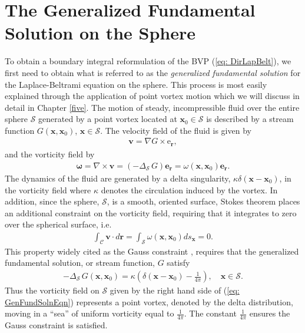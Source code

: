 \documentclass{sfuthesis}
\begin{document}
\section{The Generalized Fundamental Solution on the Sphere}
\label{sec: GenFundSoln}
To obtain a boundary integral reformulation of the BVP (\ref{eq: DirLapBelt}), we first need to obtain what is referred to as the \textit{generalized fundamental solution} for the Laplace-Beltrami equation on the sphere. This process is most easily explained through the application of point vortex motion which we will discuss in detail in Chapter \ref{five}. The motion of steady, incompressible fluid over the entire sphere $\mathcal{S}$ generated by a point vortex located at $\mathbf{x}_0 \in \mathcal{S}$ is described by a stream function $G(\mathbf{x},\mathbf{x}_0)$, $\mathbf{x} \in \mathcal{S}$. The velocity field of the fluid is given by 
\begin{align*}
	\mathbf{v}=\nabla G \times \text{e}_\mathbf{r},
\end{align*} 
and the vorticity field by 
\begin{align*}
	\bm{\omega}=\nabla \times \mathbf{v}=\left(-\Delta_{\mathcal{S}\ } G \right)\mathbf{e}_\mathbf{r}=\omega(\mathbf{x}, \mathbf{x}_0) \mathbf{e}_\mathbf{r}.
\end{align*}
The dynamics of the fluid are generated by a delta singularity, $\kappa \delta(\mathbf{x}-\mathbf{x}_0)$, in the vorticity field where $\kappa$ denotes the circulation induced by the vortex. 
In addition, since the sphere, $\mathcal{S}$, is a smooth, oriented surface, Stokes theorem places an additional constraint on the vorticity field, requiring that it integrates to zero over the spherical surface, i.e. 
\begin{align}
	\int_\mathcal{C} \mathbf{v} \cdot d\mathbf{r}=\int_\mathcal{S} \omega(\mathbf{x}, \mathbf{x}_0) ds_\mathbf{x} =0.  \label{eq: GaussConstraint} 
\end{align}
This property widely cited as the Gauss constraint \cite{Crowdy2006, Newt2001, Drit15, Crowdy2003, GemmNigStein2008}, requires that the generalized fundamental solution, or stream function, $G$ satisfy
\begin{align}
	-{\Delta}_{\mathcal{S} \ } G(\mathbf{x}, {\mathbf{x}}_0) = \kappa \left(\delta(\mathbf{x}-{\mathbf{x}}_0) - \frac{1}{4\pi}\right), \quad \mathbf{x} \in \mathcal{S}. \label{eq: GenFundSolnEqn} 
\end{align}
Thus the vorticity field on $\mathcal{S}$ given by the right hand side of (\ref{eq: GenFundSolnEqn}) represents a point vortex, denoted by the delta distribution, moving in a \enquote{sea} of uniform vorticity equal to $\frac{1}{4\pi}$. The constant $\frac{1}{4\pi}$ ensures the Gauss constraint is satisfied. 
\end{document}
